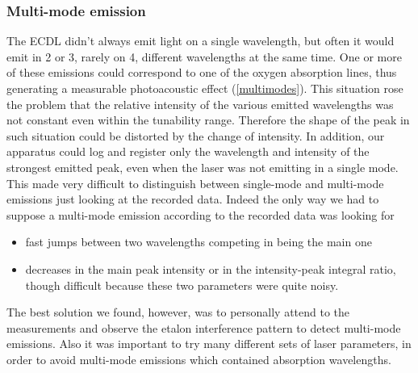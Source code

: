 \subsubsection{Multi-mode emission}
The ECDL didn't always emit light on a single wavelength, but often it would emit in 2 or 3, rarely on 4, different wavelengths at the same time. One or more of these emissions could correspond to one of the oxygen absorption lines, thus generating a measurable photoacoustic effect (\cref{multimodes}). This situation rose the problem that the relative intensity of the various emitted wavelengths was not constant even within the tunability range. Therefore the shape of the peak in such situation could be distorted by the change of intensity. In addition, our apparatus could log and register only the wavelength and intensity of the strongest emitted peak, even when the laser was not emitting in a single mode. This made very difficult to distinguish between single-mode and multi-mode emissions just looking at the recorded data. 
Indeed the only way we had to suppose a multi-mode emission according to the recorded data was looking for
\begin{itemize}
\item fast jumps between two wavelengths competing in being the main one
\item decreases in the main peak intensity or in the intensity-peak integral ratio, though difficult because these two parameters were quite noisy.
\end{itemize}
The best solution we found, however, was to personally attend to the measurements and observe the etalon interference pattern to detect multi-mode emissions. Also it was important to try many different sets of laser parameters, in order to avoid multi-mode emissions which contained absorption wavelengths.

